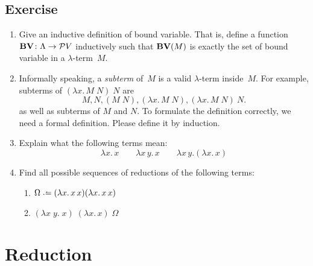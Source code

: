 \subsection*{Exercise}
\begin{enumerate}
  \item Give an inductive definition of bound variable. That is, define a
    function $\mathbf{BV}\colon \Lambda \to \mathcal{P}V$ inductively
    such that $\mathbf{BV}(M)$ is exactly the set of bound variable in a
    $\lambda$-term~$M$.
  \item Informally speaking, a \emph{subterm} of~$M$ is a valid $\lambda$-term
    inside~$M$. For example, subterms of $(\lambda x.\, M\;N)\;N$ are
    \[
      M, N, (M\;N), (\lambda x.\, M\;N), (\lambda x.\, M\;N)\:N.
    \]
    as well as subterms of $M$ and $N$.
    To formulate the definition correctly, we need a formal definition. Please
    define it by induction.
  \item Explain what the following terms mean:
    \[
      \lambda x.\,x
      \qquad
      \lambda x\,y.\,x
      \qquad
      \lambda x\,y. (\lambda x.\, x)
    \]
  \item Find all possible sequences of reductions of the following terms:
    \begin{enumerate}
      \item  $\Omega \defeq (\lambda x.\, x\,x)(\lambda x.\,x\,x)$
      \item  $(\lambda x\;y.\;x)\;(\lambda x.\,x)\;\Omega$
    \end{enumerate}
\end{enumerate}

\section{Reduction}
